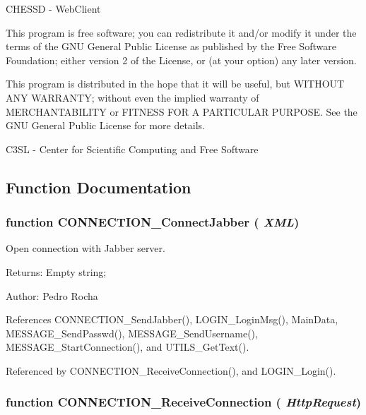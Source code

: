 CHESSD - WebClient

This program is free software; you can redistribute it and/or modify it under the terms of the GNU General Public License as published by the Free Software Foundation; either version 2 of the License, or (at your option) any later version.

This program is distributed in the hope that it will be useful, but WITHOUT ANY WARRANTY; without even the implied warranty of MERCHANTABILITY or FITNESS FOR A PARTICULAR PURPOSE. See the GNU General Public License for more details.

C3SL - Center for Scientific Computing and Free Software 

\subsection{Function Documentation}
\subsubsection[CONNECTION\_\-ConnectJabber]{\setlength{\rightskip}{0pt plus 5cm}function CONNECTION\_\-ConnectJabber ( {\em XML})}\label{connection_8js_9b036fe22f76456fd31719fe29034d7b}


Open connection with Jabber server. 

\begin{Desc}
\item[Returns:]Empty string; \end{Desc}
\begin{Desc}
\item[Author:]Pedro Rocha \end{Desc}


References CONNECTION\_\-SendJabber(), LOGIN\_\-LoginMsg(), MainData, MESSAGE\_\-SendPasswd(), MESSAGE\_\-SendUsername(), MESSAGE\_\-StartConnection(), and UTILS\_\-GetText().

Referenced by CONNECTION\_\-ReceiveConnection(), and LOGIN\_\-Login().
\subsubsection[CONNECTION\_\-ReceiveConnection]{\setlength{\rightskip}{0pt plus 5cm}function CONNECTION\_\-ReceiveConnection ( {\em HttpRequest})}\label{connection_8js_7ef92a0dd665f955bdc356908352536c}



